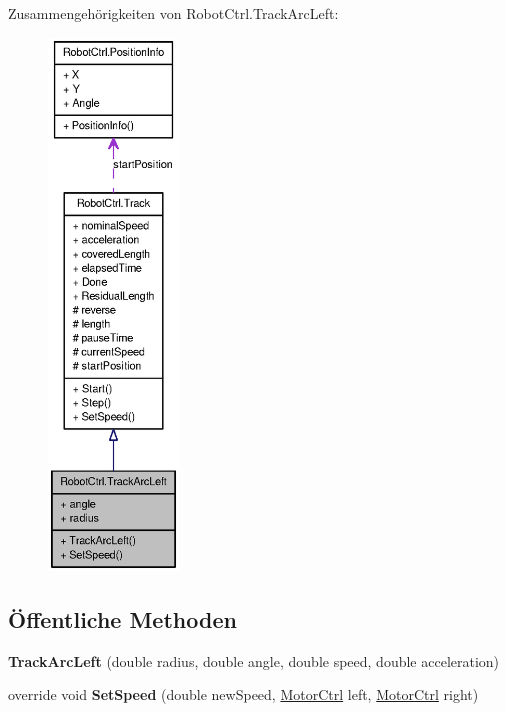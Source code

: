 Zusammengehörigkeiten von RobotCtrl.TrackArcLeft:\nopagebreak
\begin{figure}[H]
\begin{center}
\leavevmode
\includegraphics[height=400pt]{class_robot_ctrl_1_1_track_arc_left__coll__graph}
\end{center}
\end{figure}
\subsection*{Öffentliche Methoden}
\begin{DoxyCompactItemize}
\item 
\hypertarget{class_robot_ctrl_1_1_track_arc_left_a405f8fa89cf86603b3696a282d05dcff}{
{\bfseries TrackArcLeft} (double radius, double angle, double speed, double acceleration)}
\label{class_robot_ctrl_1_1_track_arc_left_a405f8fa89cf86603b3696a282d05dcff}

\item 
\hypertarget{class_robot_ctrl_1_1_track_arc_left_aee8e8c1da176807436c2946e39bbd6ae}{
override void {\bfseries SetSpeed} (double newSpeed, \hyperlink{class_robot_ctrl_1_1_motor_ctrl}{MotorCtrl} left, \hyperlink{class_robot_ctrl_1_1_motor_ctrl}{MotorCtrl} right)}
\label{class_robot_ctrl_1_1_track_arc_left_aee8e8c1da176807436c2946e39bbd6ae}

\end{DoxyCompactItemize}
